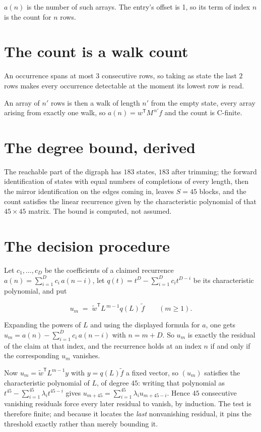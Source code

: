 \documentclass[11pt]{article}
\theoremstyle{definition}
\begin{document}
$a(n)$ is the number of such arrays. The entry's offset is 1, so its term of index $n$ is the count for $n$ rows.

\section{The count is a walk count}

An occurrence spans at most $3$ consecutive rows, so taking as state the last $2$ rows makes every occurrence detectable at the moment its lowest row is read.

An array of $n'$ rows is then a walk of length $n'$ from the empty state, every array arising from exactly one walk, so $a(n) = w^{\mathsf T}M^{\,n'}f$ and the count is C-finite.

\section{The degree bound, derived}

The reachable part of the digraph has $183$ states, $183$ after trimming; the forward identification of states with equal numbers of completions of every length, then the mirror identification on the edges coming in, leaves $S = 45$ blocks, and the count satisfies the linear recurrence given by the characteristic polynomial of that $45\times45$ matrix. The bound is computed, not assumed.

\section{The decision procedure}

Let $c_1,\dots,c_D$ be the coefficients of a claimed recurrence $a(n) = \sum_{i=1}^{D} c_i\,a(n-i)$, let $q(t) = t^{D} - \sum_{i=1}^{D} c_i t^{D-i}$ be its characteristic polynomial, and put

\[u_m \;=\; \tilde w^{\mathsf T} L^{\,m-1} q(L)\,\tilde f \qquad (m \ge 1).\]

Expanding the powers of $L$ and using the displayed formula for $a$, one gets $u_m = a(n) - \sum_{i=1}^{D} c_i\,a(n-i)$ with $n = m + D$. So $u_m$ is exactly the residual of the claim at that index, and the recurrence holds at an index $n$ if and only if the corresponding $u_m$ vanishes.

Now $u_m = \tilde w^{\mathsf T} L^{m-1} y$ with $y = q(L)\tilde f$ a fixed vector, so $(u_m)$ satisfies the characteristic polynomial of $L$, of degree $45$: writing that polynomial as $t^{45} - \sum_{i=1}^{45} \lambda_i t^{45-i}$ gives $u_{m+45} = \sum_{i=1}^{45} \lambda_i u_{m+45-i}$. Hence $45$ consecutive vanishing residuals force every later residual to vanish, by induction. The test is therefore finite; and because it locates the {\itshape last} nonvanishing residual, it pins the threshold exactly rather than merely bounding it.
\end{document}
